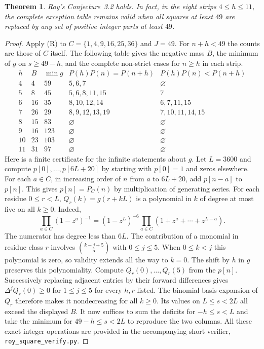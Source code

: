 \documentclass[11pt,a4paper]{article}
\newtheorem{theorem}{Theorem}[section]
\numberwithin{equation}{section}
\begin{document}
\begin{theorem}\label{th:roy-square}
Roy's Conjecture~3.2 holds. In fact, in the eight strips $4\le h\le11$,
the complete exception table remains valid when all squares at least $49$
are replaced by any set of positive integer parts at least $49$.
\end{theorem}
\begin{proof}
Apply (R) to $C=\{1,4,9,16,25,36\}$ and $J=49$. For $n+h<49$ the
counts are those of $C$ itself. The following table gives the negative
mass $B$, the minimum of $g$ on $s\ge49-h$, and the complete non-strict
cases for $n\ge h$ in each strip.
\[
\begin{array}{c|rr|l|l}
 h&B&\min g& P(h)P(n)=P(n+h)&P(h)P(n)<P(n+h)\\ \hline
 4&4&59&5,6,7&\varnothing\\
 5&8&45&5,6,8,11,15&7\\
 6&16&35&8,10,12,14&6,7,11,15\\
 7&26&29&8,9,12,13,19&7,10,11,14,15\\
 8&15&83&\varnothing&\varnothing\\
 9&16&123&\varnothing&\varnothing\\
 10&23&103&\varnothing&\varnothing\\
 11&31&97&\varnothing&\varnothing
\end{array}
\]
Here is a finite certificate for the infinite statements about $g$.
Let $L=3600$ and compute $p[0],\ldots,p[6L+20]$ by starting with
$p[0]=1$ and zeros elsewhere. For each $a\in C$, in increasing
order of $n$ from $a$ to $6L+20$, add $p[n-a]$ to $p[n]$.
This gives $p[n]=P_C(n)$ by multiplication of generating series.
For each residue $0\le r<L$, $Q_r(k)=g(r+kL)$ is a polynomial in $k$
of degree at most five on all $k\ge0$. Indeed,
\[
 \prod_{a\in C}(1-z^a)^{-1}
 =(1-z^L)^{-6}\prod_{a\in C}(1+z^a+\cdots+z^{L-a}).
\]
The numerator has degree less than $6L$. The contribution of a
monomial in residue class $r$ involves $\binom{k-j+5}{5}$ with
$0\le j\le5$. When $0\le k<j$ this polynomial is zero, so validity
extends all the way to $k=0$. The shift by $h$ in $g$ preserves this
polynomiality. Compute $Q_r(0),\ldots,Q_r(5)$ from the $p[n]$.
Successively replacing adjacent entries by their forward differences
gives $\Delta^jQ_r(0)\ge0$ for $1\le j\le5$ for every $h,r$ listed.
The binomial-basis expansion of $Q_r$ therefore makes it nondecreasing
for all $k\ge0$. Its values on $L\le s<2L$ all exceed the displayed
$B$. It now suffices to sum the deficits for $-h\le s<L$ and take
the minimum for $49-h\le s<2L$ to reproduce the two columns.
All these exact integer operations are provided in the accompanying
short verifier, \texttt{roy\_square\_verify.py}.


\end{proof}
\end{document}
